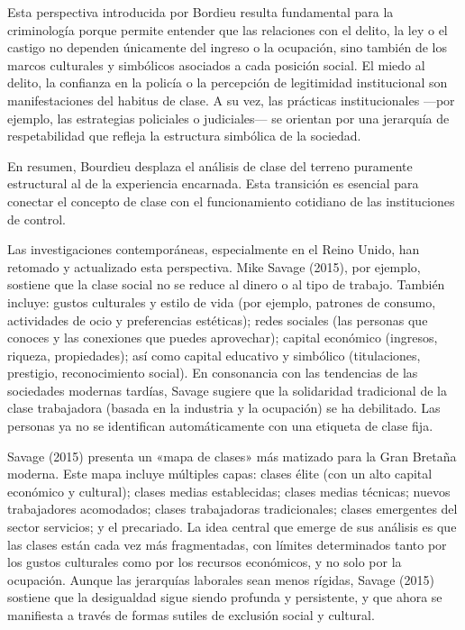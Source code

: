 \documentclass[
  spanish,
  letterpaper,
  DIV=11,
  numbers=noendperiod]{scrreprt}
\begin{document}
Esta perspectiva introducida por Bordieu resulta fundamental para la
criminología porque permite entender que las relaciones con el delito,
la ley o el castigo no dependen únicamente del ingreso o la ocupación,
sino también de los marcos culturales y simbólicos asociados a cada
posición social. El miedo al delito, la confianza en la policía o la
percepción de legitimidad institucional son manifestaciones del habitus
de clase. A su vez, las prácticas institucionales ---por ejemplo, las
estrategias policiales o judiciales--- se orientan por una jerarquía de
respetabilidad que refleja la estructura simbólica de la sociedad.

En resumen, Bourdieu desplaza el análisis de clase del terreno puramente
estructural al de la experiencia encarnada. Esta transición es esencial
para conectar el concepto de clase con el funcionamiento cotidiano de
las instituciones de control.

Las investigaciones contemporáneas, especialmente en el Reino Unido, han
retomado y actualizado esta perspectiva. Mike Savage (2015), por
ejemplo, sostiene que la clase social no se reduce al dinero o al tipo
de trabajo. También incluye: gustos culturales y estilo de vida (por
ejemplo, patrones de consumo, actividades de ocio y preferencias
estéticas); redes sociales (las personas que conoces y las conexiones
que puedes aprovechar); capital económico (ingresos, riqueza,
propiedades); así como capital educativo y simbólico (titulaciones,
prestigio, reconocimiento social). En consonancia con las tendencias de
las sociedades modernas tardías, Savage sugiere que la solidaridad
tradicional de la clase trabajadora (basada en la industria y la
ocupación) se ha debilitado. Las personas ya no se identifican
automáticamente con una etiqueta de clase fija.

Savage (2015) presenta un «mapa de clases» más matizado para la Gran
Bretaña moderna. Este mapa incluye múltiples capas: clases élite (con un
alto capital económico y cultural); clases medias establecidas; clases
medias técnicas; nuevos trabajadores acomodados; clases trabajadoras
tradicionales; clases emergentes del sector servicios; y el precariado.
La idea central que emerge de sus análisis es que las clases están cada
vez más fragmentadas, con límites determinados tanto por los gustos
culturales como por los recursos económicos, y no solo por la ocupación.
Aunque las jerarquías laborales sean menos rígidas, Savage (2015)
sostiene que la desigualdad sigue siendo profunda y persistente, y que
ahora se manifiesta a través de formas sutiles de exclusión social y
cultural.
\end{document}
